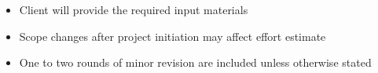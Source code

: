 \begin{itemize}[leftmargin=1.5em]
    \item Client will provide the required input materials
    \item Scope changes after project initiation may affect effort estimate
    \item One to two rounds of minor revision are included unless otherwise stated
\end{itemize}